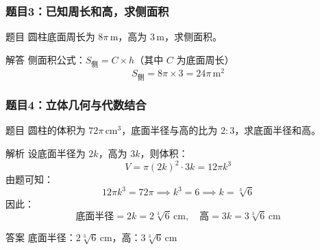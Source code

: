 \begin{frame}
    \frametitle{题目3：已知周长和高，求侧面积}
    \begin{block}{题目}
        圆柱底面周长为 \(8\pi \, \text{m}\)，高为 \(3 \, \text{m}\)，求侧面积。
    \end{block}
    
    \vspace{0.5cm}
    \pause
    
    \begin{block}{解答}
        侧面积公式：\( S_{\text{侧}} = C \times h \)（其中 \(C\) 为底面周长）
        \[
        S_{\text{侧}} = 8\pi \times 3 = 24\pi \, \text{m}^2
        \]
    \end{block}
\end{frame}


\begin{frame}
    \frametitle{题目4：立体几何与代数结合}
    \begin{block}{题目}
        圆柱的体积为 \(72\pi \, \text{cm}^3\)，底面半径与高的比为 \(2:3\)，求底面半径和高。
    \end{block}
    \pause
    
    \begin{block}{解析}
        设底面半径为 \(2k\)，高为 \(3k\)，则体积：
        \[
        V = \pi (2k)^2 \cdot 3k = 12\pi k^3
        \]
        由题可知：
        \[
        12\pi k^3 = 72\pi \implies k^3 = 6 \implies k = \sqrt[3]{6}
        \]
        因此：
        \[
        \text{底面半径} = 2k = 2\sqrt[3]{6} \, \text{cm}, \quad \text{高} = 3k = 3\sqrt[3]{6} \, \text{cm}
        \]
    \end{block}
    
    \begin{alertblock}{答案}
        底面半径：\(2\sqrt[3]{6} \, \text{cm}\)，高：\(3\sqrt[3]{6} \, \text{cm}\)
    \end{alertblock}
\end{frame}



